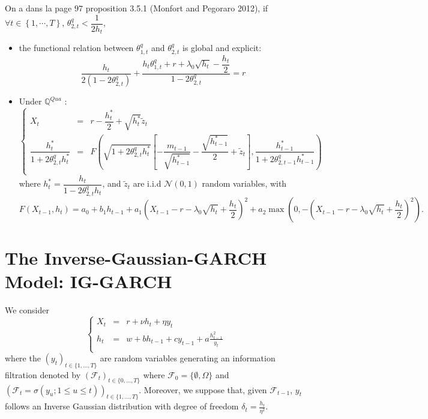 \documentclass[preprint,times,12pt]{elsarticle}
\begin{document}
On a dans la page $ 97 $ proposition 3.5.1 (Monfort and Pegoraro 2012), if $ \forall t \in \left\lbrace 1, \cdots, T\right\rbrace  $, $ \theta_{2,t}^{q}<\dfrac{1}{2 h_{t}}$, 
\begin{itemize}
\item the functional relation between $\theta_{1,t}^{q}$ and $\theta_{2,t}^{q}$ is global and explicit:
\begin{equation*}
\dfrac{h_{t}}{2\left( 1-2 \theta_{2,t}^{q}\right)}+\dfrac{h_{t}\theta_{1,t}^{q}+r+\lambda_{0}\sqrt{h_{t}}-\dfrac{h_{t}}{2}}{ 1-2 \theta_{2,t}^{q}} =r
\end{equation*}
\item Under $ \mathbb{Q}^{Qua}$ :
 \begin{equation*}
\left\{
  \begin{array}{rcl}
X_{t}& = & r-\dfrac{h_{t}^{*}}{2}+\sqrt{h_{t}^{*}}\tilde{z}_{t}\\
\dfrac{h_{t}^{*}}{1+2 \theta_{2,t}^{q}h_{t}^{*}}& =& F\left(\sqrt{1+2 \theta_{2,t}^{q}h_{t}^{*}}\left[-\dfrac{m_{t-1}}{\sqrt{h_{t-1}^{*}}} -\dfrac{\sqrt{h_{t-1}^{*}}}{2}+\tilde{z}_{t}\right],\dfrac{h_{t-1}^{*}}{1+2 \theta_{2,t-1}^{q}h_{t-1}^{*}}  \right) \\
  \end{array}
\right.
\end{equation*}
where $ h_{t}^{*}=\dfrac{h_{t}}{ 1-2 \theta_{2,t}^{q}h_{t}} $, and   $\tilde{z}_{t}$ are i.i.d $ \mathcal{N}(0,1) $ random variables, with 
 \begin{equation*}
F\left(X_{t-1},h_{t} \right)=  a_{0}+b_{1}h_{t-1}+a_{1} \left(X_{t-1}-  r -\lambda_{0}\sqrt{h_{t}}+\dfrac{h_{t}}{2} \right)^{2}
+a_{2} \max\left( 0, - \left(X_{t-1}- r-\lambda_{0}\sqrt{h_{t}}+\dfrac{h_{t}}{2}  \right)^{2}\right).
\end{equation*}

\end{itemize}


\section{The Inverse-Gaussian-GARCH   Model: IG-GARCH}

We consider  
\begin{equation}\label{equa1}
\left\{
  \begin{array}{rcl}
X_{t} & = &  r+\nu h_{t} +\eta y_{t} \\
h_{t}& = &w+bh_{t-1} + cy_{t-1} +a\frac{h_{t-1}^{2}}{y_{t}}\\
  \end{array}
\right.
\end{equation}
where the  $(y_t)_{ t\in \{1,...,T\}}$ are  random variables generating an information filtration denoted by $(\mathcal{F}_t)_{ t\in \{0,...,T\}}$ where $\mathcal{F}_0=\{\emptyset,\Omega\}$ and $(\mathcal{F}_t=\sigma(y_u;  1 \leq u\leq t))_{ t\in \{1,...,T\}}$. Moreover,  we suppose that, given  $\mathcal{F}_{t-1}$, $y_{t}$ follows an Inverse Gaussian distribution with degree of freedom  $\delta_{t}=\frac{h_{t}}{\eta^{2}}$.
\end{document}
